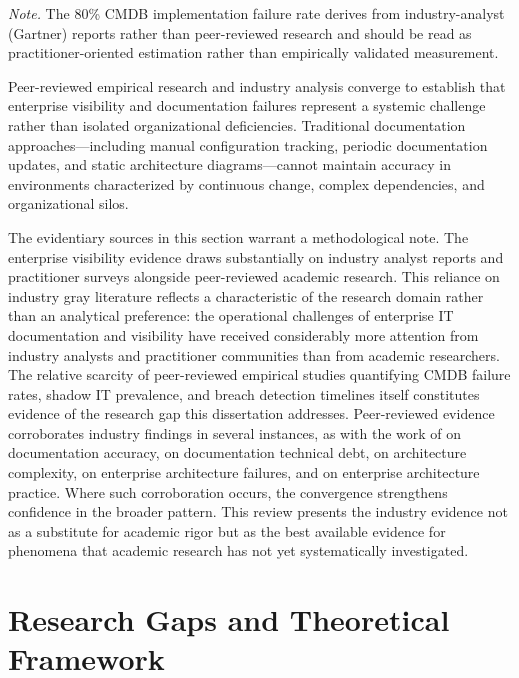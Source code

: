 \begin{table}[htbp]
  \smallskip
  {\footnotesize \textit{Note.} The 80\% CMDB implementation failure rate derives from industry-analyst (Gartner) reports rather than peer-reviewed research and should be read as practitioner-oriented estimation rather than empirically validated measurement.}
\end{table}

Peer-reviewed empirical research and industry analysis converge to establish that enterprise visibility and documentation failures represent a systemic challenge rather than isolated organizational deficiencies. Traditional documentation approaches---including manual configuration tracking, periodic documentation updates, and static architecture diagrams---cannot maintain accuracy in environments characterized by continuous change, complex dependencies, and organizational silos.

The evidentiary sources in this section warrant a methodological note. The enterprise visibility evidence draws substantially on industry analyst reports and practitioner surveys alongside peer-reviewed academic research. This reliance on industry gray literature reflects a characteristic of the research domain rather than an analytical preference: the operational challenges of enterprise IT documentation and visibility have received considerably more attention from industry analysts and practitioner communities than from academic researchers. The relative scarcity of peer-reviewed empirical studies quantifying CMDB failure rates, shadow IT prevalence, and breach detection timelines itself constitutes evidence of the research gap this dissertation addresses. Peer-reviewed evidence corroborates industry findings in several instances, as with the work of \citeauthor{Hauder_Matthes_Roth_2012} on documentation accuracy, \citeauthor{Santos_2019} on documentation technical debt, \citeauthor{Beese_2023} on architecture complexity, \citeauthor{Tamm_2022} on enterprise architecture failures, and \citeauthor{Kotusev_2019} on enterprise architecture practice. Where such corroboration occurs, the convergence strengthens confidence in the broader pattern. This review presents the industry evidence not as a substitute for academic rigor but as the best available evidence for phenomena that academic research has not yet systematically investigated.

\section{Research Gaps and Theoretical Framework}


